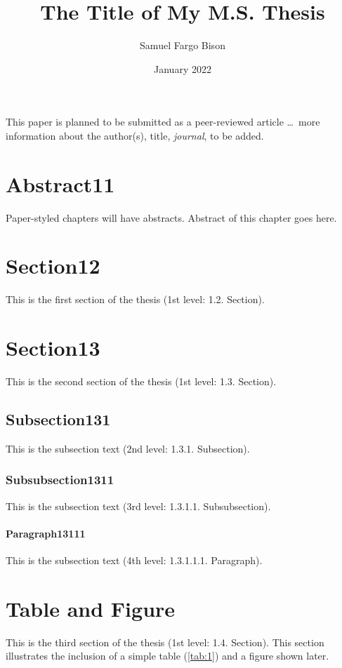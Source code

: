 \documentclass[ms-thesis,12pt,mathdesign]{ndsu-thesis-2022}
\title{The Title of My M.S. Thesis}
\author{Samuel Fargo Bison}
\date{January 2022}
\begin{document}
{This paper is planned to be submitted as a peer-reviewed article \ldots\ more information 
about the author(s),  title,  \emph{journal},  to be added.}

\section{Abstract11}
Paper-styled chapters will have abstracts. Abstract of this chapter goes here. \kant[1]

\section{Section12}
This is the first section of the thesis (1st level: 1.2. Section). \kant[2]

\section{Section13}
This is the second section of the thesis (1st level: 1.3. Section). \kant[3]

\subsection{Subsection131}
This is the subsection text (2nd level: 1.3.1. Subsection). \kant[4]

\subsubsection{Subsubsection1311}
This is the subsection text (3rd level: 1.3.1.1. Subsubsection). \kant[5]

\paragraph{Paragraph13111}
This is the subsection text (4th level: 1.3.1.1.1. Paragraph). \kant[6]

\section{Table and Figure}
This is the third section of the thesis (1st level: 1.4. Section). This section
illustrates the inclusion of a simple table (\cref{tab:1}) and a figure shown later.
\end{document}
